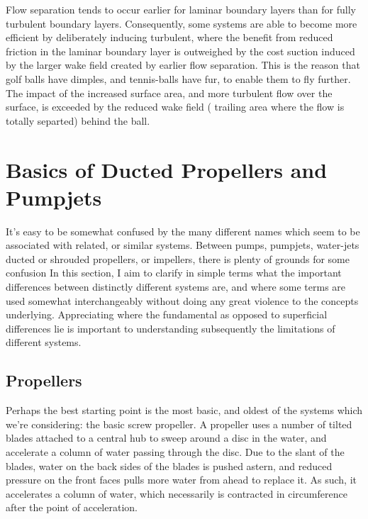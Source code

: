 \documentclass{article}\usepackage[]{graphicx}\usepackage[]{color}
\begin{document}
Flow separation tends to occur earlier for laminar boundary layers than for fully turbulent boundary layers.  Consequently, some systems are able to become more efficient  by deliberately inducing turbulent, where the benefit from reduced friction in the laminar boundary layer is outweighed by the cost suction induced by the larger wake field created by earlier flow separation.  This is the reason that golf balls have dimples, and tennis-balls have fur, to enable them to fly further.  The impact of the increased surface area, and more turbulent flow over the surface, is exceeded by the reduced wake field ( trailing area where the flow is totally separted) behind the ball.

\section{Basics of Ducted Propellers and Pumpjets}
It's easy to be somewhat confused by the many different names which seem to be associated with related, or similar systems.  Between pumps, pumpjets, water-jets ducted or shrouded propellers, or impellers, there is plenty of grounds for some confusion  In this section, I aim to clarify in simple terms what the important differences between distinctly different systems are, and where some terms are used somewhat interchangeably without doing any great violence to the concepts underlying.  Appreciating where the fundamental as opposed to superficial differences lie is important to understanding subsequently the limitations of different systems.

\subsection{Propellers}
Perhaps the best starting point is the most basic, and oldest of the systems which we're considering: the basic screw propeller.  A propeller uses a number of tilted blades attached to a central hub to sweep around a disc in the water, and accelerate a column of water passing through the disc.  Due to the slant of the blades, water on the back sides of the blades is pushed astern, and reduced pressure on the front faces pulls more water from ahead to replace it.  As such, it accelerates a column of water, which necessarily is contracted in circumference after the point of acceleration.
\end{document}
